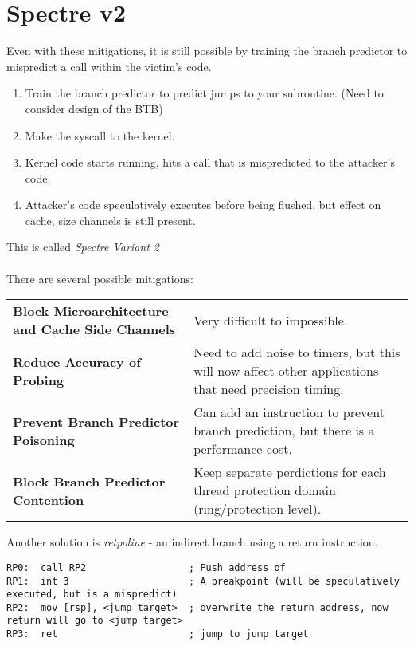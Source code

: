 \section{Spectre v2}
Even with these mitigations, it is still possible by training the branch predictor to mispredict a call within the victim's code.
\begin{enumerate}
    \item Train the branch predictor to predict jumps to your subroutine. (Need to consider design of the BTB)
    \item Make the syscall to the kernel.
    \item Kernel code starts running, hits a call that is mispredicted to the attacker's code.
    \item Attacker's code speculatively executes before being flushed, but effect on cache, size channels is still present.
\end{enumerate}
This is called \textit{Spectre Variant 2}
\\
\\ There are several possible mitigations:
\begin{center}
    \begin{tabular}{p{} p{}}
        \textbf{Block Microarchitecture and Cache Side Channels} & Very difficult to impossible. \\
        \textbf{Reduce Accuracy of Probing} & Need to add noise to timers, but this will now affect other applications that need precision timing. \\
        \textbf{Prevent Branch Predictor Poisoning} & Can add an instruction to prevent branch prediction, but there is a performance cost. \\
        \textbf{Block Branch Predictor Contention} & Keep separate perdictions for each thread protection domain (ring/protection level). \\
    \end{tabular}
\end{center}
Another solution is \textit{retpoline} - an indirect branch using a return instruction.
\begin{verbatim}
RP0:  call RP2                  ; Push address of 
RP1:  int 3                     ; A breakpoint (will be speculatively executed, but is a mispredict)
RP2:  mov [rsp], <jump target>  ; overwrite the return address, now return will go to <jump target>
RP3:  ret                       ; jump to jump target
\end{verbatim}



